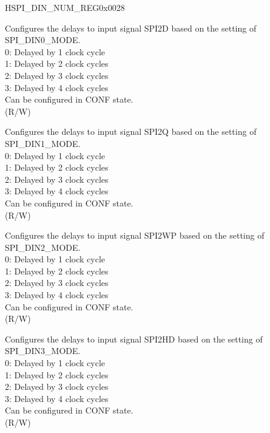 \begin{register}{H}{SPI\_DIN\_NUM\_REG}{0x0028}\label{regdesc:SPIDINNUMREG}
%
%
%
%
%
%
%
%
%
\regnewline%
\begin{regdesc}\begin{reglist}
\label{fielddesc:SPIDIN0NUM}\item [SPI\_DIN0\_NUM] Configures the delays to input signal SPI2D based on the setting of SPI\_DIN0\_MODE.\\
0: Delayed by 1 clock cycle\\
1: Delayed by 2 clock cycles\\
2: Delayed by 3 clock cycles\\
3: Delayed by 4 clock cycles\\
Can be configured in CONF state.\\
(R/W)
\label{fielddesc:SPIDIN1NUM}\item [SPI\_DIN1\_NUM] Configures the delays to input signal SPI2Q based on the setting of SPI\_DIN1\_MODE.\\
0: Delayed by 1 clock cycle\\
1: Delayed by 2 clock cycles\\
2: Delayed by 3 clock cycles\\
3: Delayed by 4 clock cycles\\
Can be configured in CONF state.\\
(R/W)
\label{fielddesc:SPIDIN2NUM}\item [SPI\_DIN2\_NUM] Configures the delays to input signal SPI2WP based on the setting of SPI\_DIN2\_MODE.\\
0: Delayed by 1 clock cycle\\
1: Delayed by 2 clock cycles\\
2: Delayed by 3 clock cycles\\
3: Delayed by 4 clock cycles\\
Can be configured in CONF state. \\
(R/W)
\label{fielddesc:SPIDIN3NUM}\item [SPI\_DIN3\_NUM] Configures the delays to input signal SPI2HD based on the setting of SPI\_DIN3\_MODE.\\
0: Delayed by 1 clock cycle\\
1: Delayed by 2 clock cycles\\
2: Delayed by 3 clock cycles\\
3: Delayed by 4 clock cycles\\
Can be configured in CONF state. \\
(R/W)
 \item [Continued on the next page...]
\end{reglist}\end{regdesc}
\end{register}

